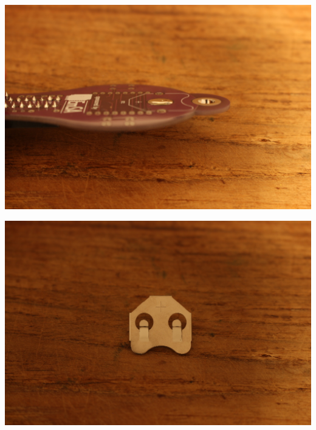 \documentclass{article}
\begin{document}
\begin{minipage}[b]{0.5\textwidth}
	\includegraphics[width=\textwidth]{Bilder2024/IMG_0049.JPG}
\end{minipage}
\begin{minipage}[b]{0.5\textwidth}
	\includegraphics[width=\textwidth]{Bilder2024/IMG_0050.JPG}
\end{minipage}

\vspace{0.5cm}
\end{document}

